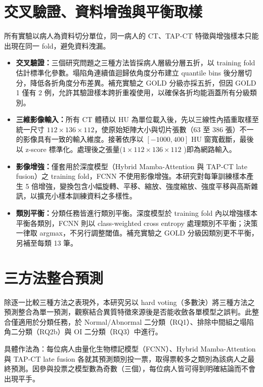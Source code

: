 \begin{ZhChapter}
\FloatBarrier
\section{交叉驗證、資料增強與平衡取樣}\label{sec:cv_aug}

所有實驗以病人為資料切分單位，同一病人的 CT、TAP-CT 特徵與增強樣本只能出現在同一 fold，避免資料洩漏。

\begin{itemize}
    \item \textbf{交叉驗證：}三個研究問題之三種方法皆採病人層級分層五折，以 training fold 估計標準化參數。塌陷角連續值迴歸依角度分布建立 quantile bins 後分層切分，降低各折角度分布差異。補充實驗之 GOLD 分級亦採五折，但因 GOLD 1 僅有 2 例，允許其驗證樣本跨折重複使用，以確保各折均能涵蓋所有分級類別。
    \item \textbf{三維影像輸入：}所有 CT 體積以 HU 為單位載入後，先以三線性內插重取樣至統一尺寸 \(112 \times 136 \times 112\)，使原始矩陣大小與切片張數（63 至 386 張）不一的影像具有一致的輸入維度。接著依序以 \([-1000, 400]\) HU 窗寬截斷，最後以 z-score 標準化。處理後之張量(\(1 \times 112 \times 136 \times 112\) )即為網路輸入。
    \item \textbf{影像增強：}僅套用於深度模型（Hybrid Mamba-Attention 與 TAP-CT late fusion）之 training fold，FCNN 不使用影像增強。本研究對每筆訓練樣本產生 5 倍增強，變換包含小幅旋轉、平移、縮放、強度縮放、強度平移與高斯雜訊，以擴充小樣本訓練資料之多樣性。
    \item \textbf{類別平衡：}分類任務皆進行類別平衡。深度模型於 training fold 內以增強樣本平衡各類別，FCNN 則以 class-weighted cross entropy 處理類別不平衡；決策一律取 argmax，不另行調整閾值。補充實驗之 GOLD 分級因類別更不平衡，另補至每類 13 筆。
\end{itemize}

\section{三方法整合預測}\label{sec:hard_voting}

除逐一比較三種方法之表現外，本研究另以 hard voting（多數決）將三種方法之預測整合為單一預測，觀察結合異質特徵來源後是否能收斂各單模型之誤判。此整合僅適用於分類任務，於 Normal/Abnormal 二分類（RQ1）、排除中間組之塌陷角二分類（RQ2b）與 OI 二分類（RQ3）中進行。

具體作法為：每位病人由量化生物標記模型（FCNN）、Hybrid Mamba-Attention 與 TAP-CT late fusion 各就其預測類別投一票，取得票較多之類別為該病人之最終預測。因參與投票之模型數為奇數（三個），每位病人皆可得到明確結論而不會出現平手。


\end{ZhChapter}
